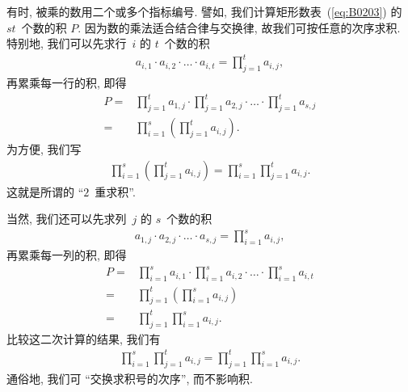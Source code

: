 \documentclass[%
    UTF8,%
    fontset=none,%
    punct=kaiming,%
    zihao=-4,%
    a4paper,%
    oneside,%
]{ctexbook}
\begin{document}
有时, 被乘的数用二个或多个指标编号.
譬如, 我们计算矩形数表~(\ref{eq:B0203}) 的 \(st\)~个数的积 \(P\).
因为数的乘法适合结合律与交换律,
故我们可按任意的次序求积.
特别地, 我们可以先求行~\(i\) 的 \(t\)~个数的积
\begin{align*}
    a_{i,1} \cdot a_{i,2} \cdot \dots \cdot a_{i,t}
    = \prod_{j = 1}^{t} {a_{i,j}},
\end{align*}
再累乘每一行的积, 即得
\begin{align*}
    P
    = {} & \prod_{j = 1}^{t} {a_{1,j}}
    \cdot \prod_{j = 1}^{t} {a_{2,j}}
    \cdot \dots
    \cdot \prod_{j = 1}^{t} {a_{s,j}}
    \\
    = {} &
    \prod_{i = 1}^{s}
    {\left( \prod_{j = 1}^{t} {a_{i,j}} \right)}.
\end{align*}
为方便, 我们写
\begin{align*}
    \prod_{i = 1}^{s}
    {\left( \prod_{j = 1}^{t} {a_{i,j}} \right)}
    = \prod_{i = 1}^{s}
    {\prod_{j = 1}^{t} {a_{i,j}}}.
\end{align*}
这就是所谓的 ``\(2\)~重求积''.

当然, 我们还可以先求列~\(j\) 的 \(s\)~个数的积
\begin{align*}
    a_{1,j} \cdot a_{2,j} \cdot \dots \cdot a_{s,j}
    = \prod_{i = 1}^{s} {a_{i,j}},
\end{align*}
再累乘每一列的积, 即得
\begin{align*}
    P
    = {} & \prod_{i = 1}^{s} {a_{i,1}}
    \cdot \prod_{i = 1}^{s} {a_{i,2}}
    \cdot \dots
    \cdot \prod_{i = 1}^{s} {a_{i,t}}
    \\
    = {} &
    \prod_{j = 1}^{t}
    {\left( \prod_{i = 1}^{s} {a_{i,j}} \right)}
    \\
    = {} &
    \prod_{j = 1}^{t}
    {\prod_{i = 1}^{s} {a_{i,j}}}.
\end{align*}
比较这二次计算的结果, 我们有
\begin{align*}
    \prod_{i = 1}^{s} {\prod_{j = 1}^{t} {a_{i,j}}}
    = \prod_{j = 1}^{t} {\prod_{i = 1}^{s} {a_{i,j}}}.
\end{align*}
通俗地, 我们可 ``交换求积号的次序'', 而不影响积.
\end{document}
